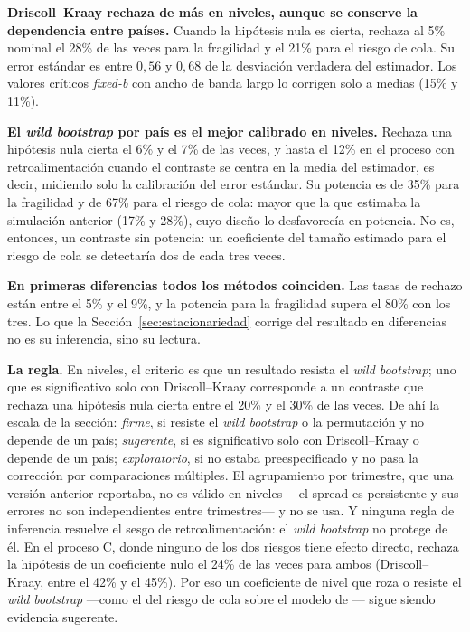 \textbf{Driscoll--Kraay rechaza de más en niveles, aunque se conserve la dependencia entre países.} Cuando la hipótesis nula es cierta, rechaza al 5\% nominal el 28\% de las veces para la fragilidad y el 21\% para el riesgo de cola. Su error estándar es entre $0{,}56$ y $0{,}68$ de la desviación verdadera del estimador. Los valores críticos \textit{fixed-b} con ancho de banda largo lo corrigen solo a medias (15\% y 11\%).

\textbf{El \textit{wild bootstrap} por país es el mejor calibrado en niveles.} Rechaza una hipótesis nula cierta el 6\% y el 7\% de las veces, y hasta el 12\% en el proceso con retroalimentación cuando el contraste se centra en la media del estimador, es decir, midiendo solo la calibración del error estándar. Su potencia es de 35\% para la fragilidad y de 67\% para el riesgo de cola: mayor que la que estimaba la simulación anterior (17\% y 28\%), cuyo diseño lo desfavorecía en potencia. No es, entonces, un contraste sin potencia: un coeficiente del tamaño estimado para el riesgo de cola se detectaría dos de cada tres veces.

\textbf{En primeras diferencias todos los métodos coinciden.} Las tasas de rechazo están entre el 5\% y el 9\%, y la potencia para la fragilidad supera el 80\% con los tres. Lo que la Sección~\ref{sec:estacionariedad} corrige del resultado en diferencias no es su inferencia, sino su lectura.

\textbf{La regla.} En niveles, el criterio es que un resultado resista el \textit{wild bootstrap}; uno que es significativo solo con Driscoll--Kraay corresponde a un contraste que rechaza una hipótesis nula cierta entre el 20\% y el 30\% de las veces. De ahí la escala de la sección: \emph{firme}, si resiste el \textit{wild bootstrap} o la permutación y no depende de un país; \emph{sugerente}, si es significativo solo con Driscoll--Kraay o depende de un país; \emph{exploratorio}, si no estaba preespecificado y no pasa la corrección por comparaciones múltiples. El agrupamiento por trimestre, que una versión anterior reportaba, no es válido en niveles ---el spread es persistente y sus errores no son independientes entre trimestres--- y no se usa. Y ninguna regla de inferencia resuelve el sesgo de retroalimentación: el \textit{wild bootstrap} no protege de él. En el proceso C, donde ninguno de los dos riesgos tiene efecto directo, rechaza la hipótesis de un coeficiente nulo el 24\% de las veces para ambos (Driscoll--Kraay, entre el 42\% y el 45\%). Por eso un coeficiente de nivel que roza o resiste el \textit{wild bootstrap} ---como el del riesgo de cola sobre el modelo de \citet{Chari2024b}--- sigue siendo evidencia sugerente.

